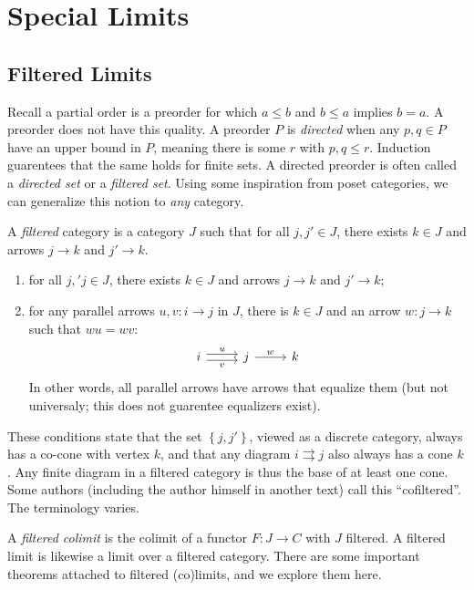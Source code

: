 \chapter{Special Limits}

\section{Filtered Limits}

Recall a partial order is a preorder for which $a\leq b$ and $b\leq a$ implies $b=a$. A preorder does not have this quality. A preorder $P$ is \emph{directed} when any $p,q\in P$ have an upper bound in $P$, meaning there is some $r$ with $p,q\leq r$. Induction guarentees that the same holds for finite sets. A directed preorder is often called a \emph{directed set} or a \emph{filtered set}. Using some inspiration from poset categories, we can generalize this notion to \emph{any} category.

\begin{definition}\label{dfn:9.1}
	A \emph{filtered} category is a category $J$ such that for all $j,j'\in J$, there exists $k\in J$ and arrows $j\to k$ and $j'\to k$. 
	\begin{enumerate}
		\item for all $j,'j\in J$, there exists $k\in J$ and arrows $j\to k$ and $j'\to k$;
		\item for any parallel arrows $u,v : i \to j$ in $J$, there is $k\in J$ and an arrow $w : j \to k$ such that $wu=wv$:
			\[\begin{tikzcd}[row sep = 2.5em, column sep = 2.5em]
			i \ar[" u ", shift left, r] \ar["  v "', shift right, r]  & j \ar[" w ", r]  & k
			\end{tikzcd}\]
			In other words, all parallel arrows have arrows that equalize them (but not universaly; this does not guarentee equalizers exist).
	\end{enumerate}
\end{definition}

These conditions state that the set $\left\{ j,j' \right\} $, viewed as a discrete category, always has a co-cone with vertex $k$, and that any diagram $i\rightrightarrows j$ also always has a cone $k$. Any finite diagram in a filtered category is thus the base of at least one cone. Some authors (including the author himself in another text) call this ``cofiltered''. The terminology varies.

A \emph{filtered colimit} is the colimit of a functor $F : J \to C$ with $J$ filtered. A filtered limit is likewise a limit over a filtered category. There are some important theorems attached to filtered (co)limits, and we explore them here.

